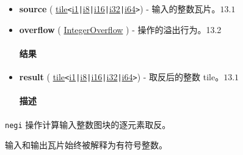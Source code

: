 \documentclass{article}
\begin{document}
\begin{itemize}
\item \textbf{source} ( \href{https://docs.nvidia.com/cuda/tile-ir/latest/sections/types.html#type-tile}{tile}\texttt{<}\href{https://docs.nvidia.com/cuda/tile-ir/latest/sections/types.html#subsection-element-types}{i1}\texttt{|}\href{https://docs.nvidia.com/cuda/tile-ir/latest/sections/types.html#subsection-element-types}{i8}\texttt{|}\href{https://docs.nvidia.com/cuda/tile-ir/latest/sections/types.html#subsection-element-types}{i16}\texttt{|}\href{https://docs.nvidia.com/cuda/tile-ir/latest/sections/types.html#subsection-element-types}{i32}\texttt{|}\href{https://docs.nvidia.com/cuda/tile-ir/latest/sections/types.html#subsection-element-types}{i64}\texttt{>}) - 输入的整数瓦片。$\boxed{13.1}$
\item \textbf{overflow} ( \href{https://docs.nvidia.com/cuda/tile-ir/latest/sections/operations.html#op-attribute-cuda-tile-negi-integeroverflow-attr}{IntegerOverflow} ) - 操作的溢出行为。13.2




\paragraph{结果}


\item \textbf{result} ( \href{https://docs.nvidia.com/cuda/tile-ir/latest/sections/types.html#type-tile}{tile}\texttt{<}\href{https://docs.nvidia.com/cuda/tile-ir/latest/sections/types.html#subsection-element-types}{i1}\texttt{|}\href{https://docs.nvidia.com/cuda/tile-ir/latest/sections/types.html#subsection-element-types}{i8}\texttt{|}\href{https://docs.nvidia.com/cuda/tile-ir/latest/sections/types.html#subsection-element-types}{i16}\texttt{|}\href{https://docs.nvidia.com/cuda/tile-ir/latest/sections/types.html#subsection-element-types}{i32}\texttt{|}\href{https://docs.nvidia.com/cuda/tile-ir/latest/sections/types.html#subsection-element-types}{i64}\texttt{>}) - 取反后的整数 tile。$\boxed{13.1}$




\paragraph{描述}


\end{itemize}
\texttt{negi} 操作计算输入整数图块的逐元素取反。

输入和输出瓦片始终被解释为有符号整数。
\end{document}
